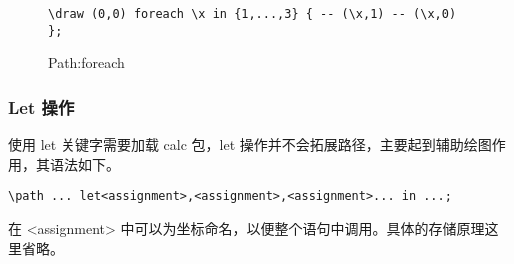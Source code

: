 \begin{figure}[H]
    \centering
    \begin{minipage}{0.35\linewidth}
        \centering
    \end{minipage}
    \begin{minipage}{0.55\linewidth}
        \begin{lstlisting}[style = latex-side]
    \draw (0,0) foreach \x in {1,...,3} { -- (\x,1) -- (\x,0) };
        \end{lstlisting}
    \end{minipage}
    \caption{Path:foreach}
\end{figure}

\subsubsection{Let 操作}

使用 let 关键字需要加载 calc 包，let 操作并不会拓展路径，主要起到辅助绘图作用，其语法如下。

\begin{lstlisting}[style = latex]
    \path ... let<assignment>,<assignment>,<assignment>... in ...;
\end{lstlisting}

在 <assignment> 中可以为坐标命名，以便整个语句中调用。具体的存储原理这里省略。

